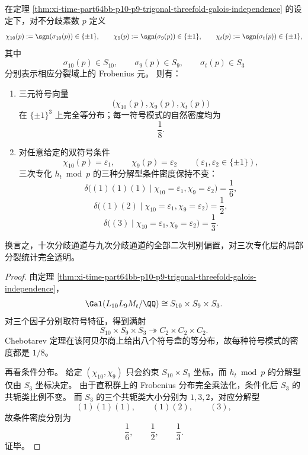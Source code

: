 \begin{theorem}[三重判别特征立方体的等分布与三次分裂律的条件不变性]\label{thm:xi-time-part64bb-p10-p9-trigonal-signcube-equidistribution}
在定理 \ref{thm:xi-time-part64bb-p10-p9-trigonal-threefold-galois-independence} 的设定下，对不分歧素数 \(p\) 定义
\[
\chi_{10}(p):=\sgn(\sigma_{10}(p))\in\{\pm 1\},
\qquad
\chi_9(p):=\sgn(\sigma_9(p))\in\{\pm 1\},
\qquad
\chi_t(p):=\sgn(\sigma_t(p))\in\{\pm 1\},
\]
其中
\[
\sigma_{10}(p)\in S_{10},
\qquad
\sigma_9(p)\in S_9,
\qquad
\sigma_t(p)\in S_3
\]
分别表示相应分裂域上的 Frobenius 元。
则有：
\begin{enumerate}
  \item 三元符号向量
  \[
  \bigl(\chi_{10}(p),\chi_9(p),\chi_t(p)\bigr)
  \]
  在 \(\{\pm1\}^3\) 上完全等分布；每一符号模式的自然密度均为
  \[
  \frac{1}{8}.
  \]
  \item 对任意给定的双符号条件
  \[
  \chi_{10}(p)=\varepsilon_1,
  \qquad
  \chi_9(p)=\varepsilon_2
  \qquad
  (\varepsilon_1,\varepsilon_2\in\{\pm1\}),
  \]
  三次专化 \(h_t\bmod p\) 的三种分解型条件密度保持不变：
  \[
  \delta\bigl((1)(1)(1)\mid \chi_{10}=\varepsilon_1,\chi_9=\varepsilon_2\bigr)=\frac16,
  \]
  \[
  \delta\bigl((1)(2)\mid \chi_{10}=\varepsilon_1,\chi_9=\varepsilon_2\bigr)=\frac12,
  \]
  \[
  \delta\bigl((3)\mid \chi_{10}=\varepsilon_1,\chi_9=\varepsilon_2\bigr)=\frac13.
  \]
\end{enumerate}
换言之，十次分歧通道与九次分歧通道的全部二次判别偏置，对三次专化层的局部分裂统计完全透明。
\end{theorem}
\begin{proof}
由定理 \ref{thm:xi-time-part64bb-p10-p9-trigonal-threefold-galois-independence}，
\[
\Gal(L_{10}L_9M_t/\QQ)\cong S_{10}\times S_9\times S_3.
\]
对三个因子分别取符号特征，得到满射
\[
S_{10}\times S_9\times S_3\twoheadrightarrow C_2\times C_2\times C_2.
\]
Chebotarev 定理在该阿贝尔商上给出八个符号盒的等分布，故每种符号模式的密度都是 \(1/8\)。

再看条件分布。
给定 \((\chi_{10},\chi_9)\) 只会约束 \(S_{10}\times S_9\) 坐标，而 \(h_t\bmod p\) 的分解型仅由 \(S_3\) 坐标决定。
由于直积群上的 Frobenius 分布完全乘法化，条件化后 \(S_3\) 的共轭类比例不变。
而 \(S_3\) 的三个共轭类大小分别为 \(1,3,2\)，对应分解型
\[
(1)(1)(1),\qquad (1)(2),\qquad (3),
\]
故条件密度分别为
\[
\frac16,\qquad \frac12,\qquad \frac13.
\]
证毕。
\end{proof}

